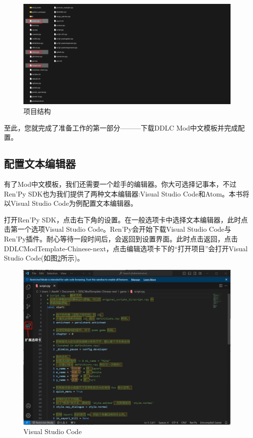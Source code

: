 \documentclass[../../Main.tex]{subfiles}
\begin{document}
\begin{figure}[htbp]
    \centering
    \includegraphics[scale=.2]{2.1/2.1.2}
    \caption{项目结构}
    \label{fig:2.1.1.2}
\end{figure}

至此，您就完成了准备工作的第一部分———下载DDLC Mod中文模板并完成配置。

\subsection{配置文本编辑器}
\label{2.1.2}
有了Mod中文模板，我们还需要一个趁手的编辑器。你大可选择记事本，不过Ren'Py SDK也为我们提供了两种文本编辑器:Visual Studio Code和Atom。本书将以Visual Studio Code为例配置文本编辑器。

打开Ren'Py SDK，点击右下角的设置。在一般选项卡中选择文本编辑器，此时点击第一个选项Visual Studio Code。Ren'Py会开始下载Visual Studio Code与Ren'Py插件。耐心等待一段时间后，会返回到设置界面。此时点击返回，点击DDLCModTemplate-Chinese-next，点击编辑选项卡下的“打开项目”会打开Visual Studio Code(如图\ref{fig:2.1.2.1}所示)。

\begin{figure}[htbp]
    \centering
    \includegraphics[scale=.4]{2.1/2.1.3}
    \caption{Visual Studio Code}
    \label{fig:2.1.2.1}
\end{figure}
\end{document}
